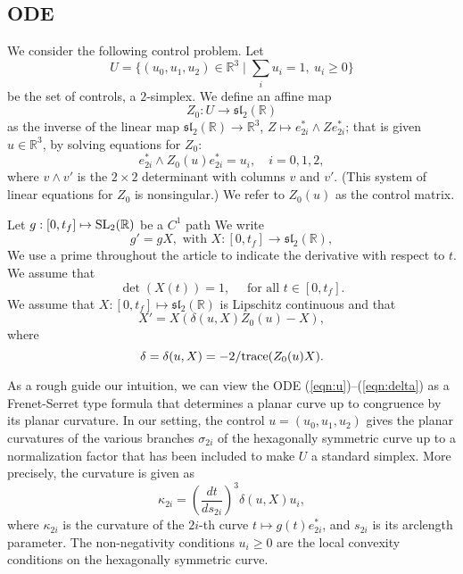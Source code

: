 \documentclass{article}
\theoremstyle{remark}
\newcommand{\ring}[1]{\mathbb{#1}}
\newcommand{\op}[1]{\hbox{#1}}
\def\sl{\mathfrak{sl}_2(\ring{R})}
\def\SL{\op{SL}_2(\ring{R})}
\newcommand\ee[1]{e_{#1}^*}
\begin{document}
\subsection{ODE}


We consider the following control problem.  
Let 
\[
U = \{(u_0,u_1,u_2)\in \ring{R}^3\mid \sum_i u_i = 1,\ u_i\ge 0\}
\]
be the set of controls, a $2$-simplex.
We define an affine map 
\[
Z_0: U\to \sl
\]
as the inverse of the linear map $\sl\to\ring{R}^3$, $Z\mapsto
\ee{2i}\wedge Z \ee{2i}$; that is given $u\in\ring{R}^3$, by solving
equations for $Z_0$:
\begin{equation}\label{eqn:u}
  \ee{2i} \wedge Z_0(u) \ee{2i} = u_i,\quad i = 0,1,2,
\end{equation}
where $v \wedge v'$ is the $2\times 2$ determinant with columns $v$
and $v'$.  (This system of linear equations for $Z_0$ is nonsingular.)
We refer to $Z_0(u)$ as the control matrix.

Let $g:[0,t_f]\mapsto \SL$ be a $C^1$ path 
We write
\begin{equation}\label{eqn:g}
g' = g X, \text{ with } X:[0,t_f]\to \sl,
\end{equation}
We use a prime throughout the article to indicate the derivative
with respect to $t$.
We assume that
\begin{equation}\label{eqn:unit}
\det(X(t))=1,\quad \text{ for all } t\in [0,t_f].
\end{equation}
We assume that $X:[0,t_f]\mapsto \sl$ is Lipschitz continuous and that
\begin{equation}\label{eqn:X'}
X' = X (\delta(u,X) Z_0(u) - X),
\end{equation}
where 
\begin{equation}\label{eqn:delta}
\delta = \delta(u,X) = -2/\op{trace}(Z_0 (u) X).
\end{equation}


As a rough guide our intuition, we can view the ODE
(\ref{eqn:u})--(\ref{eqn:delta}) as a Frenet-Serret type formula that
determines a planar curve up to congruence by its planar curvature.
In our setting, the control $u=(u_0,u_1,u_2)$ gives the planar
curvatures of the various branches $\sigma_{2i}$ of the hexagonally
symmetric curve up to a normalization factor that has been included to
make $U$ a standard simplex.  More precisely, the curvature is given
as
\begin{equation}\label{eqn:kappa}
\kappa_{2i} = \left(\frac{dt}{ds_{2i}}\right)^3 \delta(u,X) u_i,
\end{equation}
where $\kappa_{2i}$ is the curvature of the $2i$-th curve $t\mapsto
g(t) \ee{2i}$, and $s_{2i}$ is its arclength parameter.  The
non-negativity conditions $u_i\ge 0$ are the local convexity
conditions on the hexagonally symmetric curve.
\end{document}
